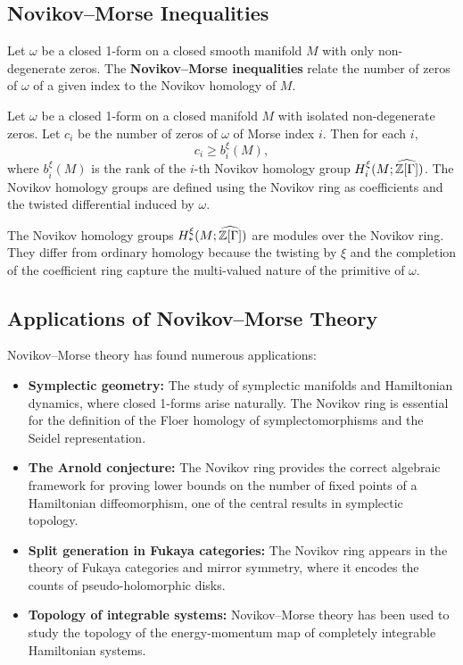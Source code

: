 \subsection{Novikov--Morse Inequalities}

Let \(\omega\) be a closed 1-form on a closed smooth manifold \(M\) with only non-degenerate zeros. The \textbf{Novikov--Morse inequalities} relate the number of zeros of \(\omega\) of a given index to the Novikov homology of \(M\).

\begin{theorem}[Novikov, 1981]
Let \(\omega\) be a closed 1-form on a closed manifold \(M\) with isolated non-degenerate zeros. Let \(c_i\) be the number of zeros of \(\omega\) of Morse index \(i\). Then for each \(i\),
\[
c_i \geq b_i^{\xi}(M),
\]
where \(b_i^{\xi}(M)\) is the rank of the \(i\)-th Novikov homology group \(H_i^{\xi}(M; \widehat{\mathbb{Z}[\Gamma]})\). The Novikov homology groups are defined using the Novikov ring as coefficients and the twisted differential induced by \(\omega\).
\end{theorem}

The Novikov homology groups \(H_*^{\xi}(M; \widehat{\mathbb{Z}[\Gamma]})\) are modules over the Novikov ring. They differ from ordinary homology because the twisting by \(\xi\) and the completion of the coefficient ring capture the multi-valued nature of the primitive of \(\omega\).

\subsection{Applications of Novikov--Morse Theory}

Novikov--Morse theory has found numerous applications:
\begin{itemize}
    \item \textbf{Symplectic geometry:} The study of symplectic manifolds and Hamiltonian dynamics, where closed 1-forms arise naturally. The Novikov ring is essential for the definition of the Floer homology of symplectomorphisms and the Seidel representation.
    \item \textbf{The Arnold conjecture:} The Novikov ring provides the correct algebraic framework for proving lower bounds on the number of fixed points of a Hamiltonian diffeomorphism, one of the central results in symplectic topology.
    \item \textbf{Split generation in Fukaya categories:} The Novikov ring appears in the theory of Fukaya categories and mirror symmetry, where it encodes the counts of pseudo-holomorphic disks.
    \item \textbf{Topology of integrable systems:} Novikov--Morse theory has been used to study the topology of the energy-momentum map of completely integrable Hamiltonian systems.
\end{itemize}

